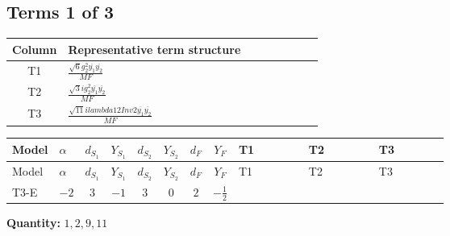 \documentclass[8pt]{article}
\begin{document}
\begin{landscape}
\subsection*{Terms 1 of 3}
\begin{center}
\begin{tabular}{@{}c >{\raggedright\arraybackslash}p{0.82\linewidth}@{}}
\toprule
Column & Representative term structure \\
\midrule
T1 & \(\displaystyle \frac{\sqrt{6} g_{2}^{2} \overline{y_{1}} \overline{y_{2}}}{MF}\) \\
\midrule
T2 & \(\displaystyle \frac{\sqrt{3} i g_{2}^{2} \overline{y_{1}} \overline{y_{2}}}{MF}\) \\
\midrule
T3 & \(\displaystyle \frac{\sqrt{11} i lambda12Inv2 \overline{y_{1}} \overline{y_{2}}}{MF}\) \\
\midrule
\bottomrule
\end{tabular}
\end{center}
\smallskip
\tiny
\begin{longtable}{@{}llcccccc >{\raggedright\arraybackslash}p{0.21\linewidth} >{\raggedright\arraybackslash}p{0.21\linewidth} >{\raggedright\arraybackslash}p{0.21\linewidth}@{}}
\toprule
Model & $\alpha$ & $d_{S_1}$ & $Y_{S_1}$ & $d_{S_2}$ & $Y_{S_2}$ & $d_F$ & $Y_F$ & T1 & T2 & T3 \\
\midrule
\endfirsthead
\toprule
Model & $\alpha$ & $d_{S_1}$ & $Y_{S_1}$ & $d_{S_2}$ & $Y_{S_2}$ & $d_F$ & $Y_F$ & T1 & T2 & T3 \\
\midrule
\endhead
T3-E & $-2$ & $3$ & $-1$ & $3$ & $0$ & $2$ & $-\frac{1}{2}$ & \scriptsize\adjustbox{max width=\linewidth}{$\begin{gathered} - \frac{\sqrt{6} g_{2}^{2} \overline{y_{1}} \overline{y_{2}}}{6 MF}\end{gathered}$} & \scriptsize\adjustbox{max width=\linewidth}{$\begin{gathered} - \frac{15 \sqrt{3} i g_{2}^{2} \overline{y_{1}} \overline{y_{2}}}{8 MF}\end{gathered}$} & \scriptsize\adjustbox{max width=\linewidth}{$\begin{gathered} - \frac{3 \sqrt{11} i lambda12Inv2 \overline{y_{1}} \overline{y_{2}}}{22 MF}\end{gathered}$} \\
\midrule
\bottomrule
\end{longtable}
\clearpage
\noindent\textbf{Quantity: }$\mathrm{1,2,9,11}$\par\smallskip

\end{landscape}
\end{document}
